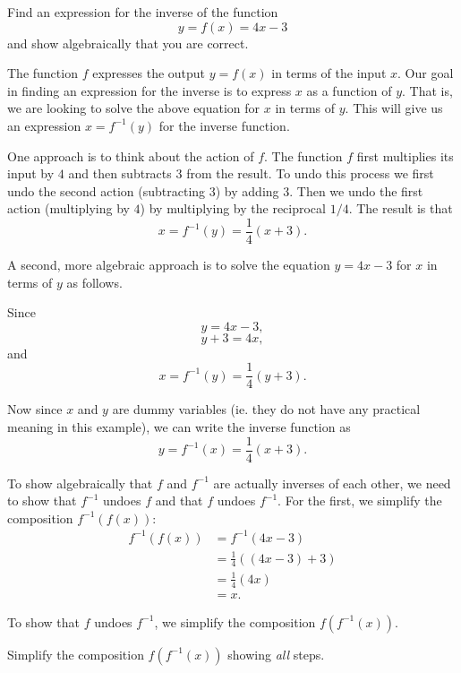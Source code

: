 \documentclass{ximera}
\begin{document}
\begin{example}  \label{Ex:4577hhhh}
Find an expression for the inverse of the function
\[
    y= f(x) = 4x -3 
\]
and show algebraically that you are correct.

\begin{explanation}
The function $f$ expresses the output $y=f(x)$ in terms of the input $x$. Our goal in finding an expression for the inverse is to express  $x$ as a function of $y$. That is, we are looking to solve the above equation for $x$ in terms of $y$. This will give us an expression $x=f^{-1}(y)$ for the inverse function. 

One approach is to think about the action of $f$. The function $f$ first multiplies its input by $4$ and then subtracts $3$ from the result. To undo this process we first undo the second action (subtracting $3$) by adding $3$. Then we undo the first action (multiplying by $4$) by multiplying by the reciprocal $1/4$. The result is that
\[
     x =    f^{-1}(y) = \frac{1}{4} \left( x+3 \right) .
\] 

A second, more algebraic approach is to solve the equation $y=4x-3$ for $x$ in terms of $y$ as follows.

Since 
\[
    y = 4x - 3, 
\]
\[
         y + 3 = 4x ,
\]
and
\[
    x = f^{-1}(y) = \frac{1}{4}\left( y + 3 \right) .
\]

Now since $x$ and $y$ are dummy variables (ie. they do not have any practical meaning in this example), we can write the inverse function as 
\[
       y = f^{-1}(x) =  \frac{1}{4}\left( x+3 \right) .
\]

To show algebraically that $f$ and $f^{-1}$ are actually inverses of each other, we need to show that $f^{-1}$ undoes $f$ and that $f$ undoes $f^{-1}$. For the first, we simplify the composition $f^{-1}(f(x))$:
\begin{align*}
        f^{-1}(f(x)) &= f^{-1}(4x-3) \\
                          &= \frac{1}{4}\left( (4x-3)+3 \right) \\
                          &= \frac{1}{4}\left( 4x \right) \\
                          &= x .
\end{align*}

To show that $f$ undoes $f^{-1}$, we simplify the composition $f(f^{-1}(x))$.

\begin{question}  \label{Q343fggg}
Simplify the composition $f(f^{-1}(x))$ showing \emph{all} steps.
\end{question}
\end{explanation}
\end{example}
\end{document}
